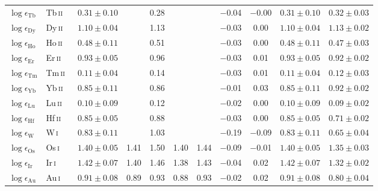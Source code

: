 \documentclass[traditabstract]{aa}
\newcommand{\ph}{\phantom{$-$}}
\newcommand{\altosi}{Os\,\textsc{i}}
\newcommand{\altiri}{Ir\,\textsc{i}}
\newcommand{\altaui}{Au\,\textsc{i}}
\newcommand{\alttbii}{Tb\,\textsc{ii}}
\newcommand{\altwi}{W\,\textsc{i}}
\newcommand{\althfii}{Hf\,\textsc{ii}}
\newcommand{\altdyii}{Dy\,\textsc{ii}}
\newcommand{\althoii}{Ho\,\textsc{ii}}
\newcommand{\alterii}{Er\,\textsc{ii}}
\newcommand{\altluii}{Lu\,\textsc{ii}}
\newcommand{\altybii}{Yb\,\textsc{ii}}
\newcommand{\alttmii}{Tm\,\textsc{ii}}
\newcommand{\osi}{\altosi\ }
\newcommand{\iri}{\altiri\ }
\newcommand{\aui}{\altaui\ }
\newcommand{\tbii}{\alttbii\ }
\newcommand{\wi}{\altwi\ }
\newcommand{\hfii}{\althfii\ }
\newcommand{\dyii}{\altdyii\ }
\newcommand{\hoii}{\althoii\ }
\newcommand{\erii}{\alterii\ }
\newcommand{\luii}{\altluii\ }
\newcommand{\tmii}{\alttmii\ }
\newcommand{\ybii}{\altybii\ }
\begin{document}
\begin{table}[p]
\begin{tabular}{l l c c c c c c c c c}
$\log \epsilon_\mathrm{Tb}$     & \tbii   & $0.31\pm0.10$ &      & 0.28 &      &      & $-$0.04 & $-$0.00 & $0.31\pm0.10$ & $0.32\pm0.03$\vspace{1mm}\\
$\log \epsilon_\mathrm{Dy}$     & \dyii   & $1.10\pm0.04$ &      & 1.13 &      &      & $-$0.03 & \ph0.00 & $1.10\pm0.04$ & $1.13\pm0.02$\vspace{1mm}\\
$\log \epsilon_\mathrm{Ho}$     & \hoii   & $0.48\pm0.11$ &      & 0.51 &      &      & $-$0.03 & \ph0.00 & $0.48\pm0.11$ & $0.47\pm0.03$\vspace{1mm}\\
$\log \epsilon_\mathrm{Er}$     & \erii   & $0.93\pm0.05$ &      & 0.96 &      &      & $-$0.03 & \ph0.01 & $0.93\pm0.05$ & $0.92\pm0.02$\vspace{1mm}\\
$\log \epsilon_\mathrm{Tm}$     & \tmii   & $0.11\pm0.04$ &      & 0.14 &      &      & $-$0.03 & \ph0.01 & $0.11\pm0.04$ & $0.12\pm0.03$\vspace{1mm}\\
$\log \epsilon_\mathrm{Yb}$     & \ybii   & $0.85\pm0.11$ &      & 0.86 &      &      & $-$0.01 & \ph0.03 & $0.85\pm0.11$ & $0.92\pm0.02$\vspace{1mm}\\
$\log \epsilon_\mathrm{Lu}$     & \luii   & $0.10\pm0.09$ &      & 0.12 &      &      & $-$0.02 & \ph0.00 & $0.10\pm0.09$ & $0.09\pm0.02$\vspace{1mm}\\
$\log \epsilon_\mathrm{Hf}$     & \hfii   & $0.85\pm0.05$ &      & 0.88 &      &      & $-$0.03 & \ph0.00 & $0.85\pm0.05$ & $0.71\pm0.02$\vspace{1mm}\\
$\log \epsilon_\mathrm{W}$      & \wi     & $0.83\pm0.11$ &      & 1.03 &      &      & $-$0.19 & $-$0.09 & $0.83\pm0.11$ & $0.65\pm0.04$\vspace{1mm}\\
$\log \epsilon_\mathrm{Os}$     & \osi    & $1.40\pm0.05$ & 1.41 & 1.50 & 1.40 & 1.44 & $-$0.09 & $-$0.01 & $1.40\pm0.05$ & $1.35\pm0.03$\vspace{1mm}\\
$\log \epsilon_\mathrm{Ir}$     & \iri    & $1.42\pm0.07$ & 1.40 & 1.46 & 1.38 & 1.43 & $-$0.04 & \ph0.02 & $1.42\pm0.07$ & $1.32\pm0.02$\vspace{1mm}\\
$\log \epsilon_\mathrm{Au}$     & \aui    & $0.91\pm0.08$ & 0.89 & 0.93 & 0.88 & 0.93 & $-$0.02 & \ph0.02 & $0.91\pm0.08$ & $0.80\pm0.04$\vspace{1mm}\\

\end{tabular}
\end{table}
\end{document}
